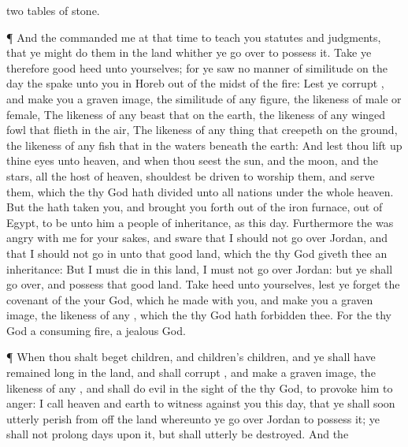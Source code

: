 {two
tables of
stone.
\par }{\PP {}¶ And the
{}
commanded me at that
time to
teach you
statutes and
judgments, that ye might
do them in the
land whither ye go
over to
possess it.
Take ye therefore
good
heed unto
yourselves; for ye
saw no manner of
similitude on the
day
{} the
{}
spake unto you in
Horeb out of the
midst of the
fire:
Lest ye
corrupt
{}, and
make you a graven
image, the
similitude of any
figure, the
likeness of
male or
female,
The
likeness of any
beast that
{} on the
earth, the
likeness of any
winged
fowl that
flieth in the
air,
The
likeness of any thing that
creepeth on the
ground, the
likeness of any
fish that
{} in the
waters
beneath the
earth:
And lest thou lift
up thine
eyes unto
heaven, and when thou
seest the
sun, and the
moon, and the
stars,
{} all the
host of
heaven, shouldest be
driven to
worship them, and
serve them, which the
{} thy
God hath
divided unto all
nations under the whole
heaven.
But the
{} hath
taken you, and brought you
forth out of the
iron
furnace,
{} out of
Egypt, to be unto him a
people of
inheritance, as
{} this
day.
Furthermore the
{} was
angry with me for your
sakes, and
sware that I should not go
over
Jordan, and that I should not
go in unto that
good
land, which the
{} thy
God
giveth thee
{} an
inheritance:
But I must
die in this
land, I must not go
over
Jordan: but ye shall go
over, and
possess that
good
land.
Take
heed unto yourselves, lest ye
forget the
covenant of the
{} your
God, which he
made with you, and
make you a graven
image,
{} the
likeness of
any
{}, which the
{} thy
God hath
forbidden thee.
For the
{} thy
God
{} a
consuming
fire,
{} a
jealous
God.
\par }{\PP {}¶ When thou shalt
beget
children, and
children’s
children, and ye shall have remained
long in the
land, and shall
corrupt
{}, and
make a graven
image,
{} the
likeness of any
{}, and shall
do
evil in the
sight of the
{} thy
God, to provoke him to
anger:
I
call
heaven and
earth to
witness against you this
day, that ye shall
soon
utterly
perish from off the
land whereunto ye go
over
Jordan to
possess it; ye shall not
prolong
{}
days upon it, but shall
utterly be
destroyed.
And the
}
